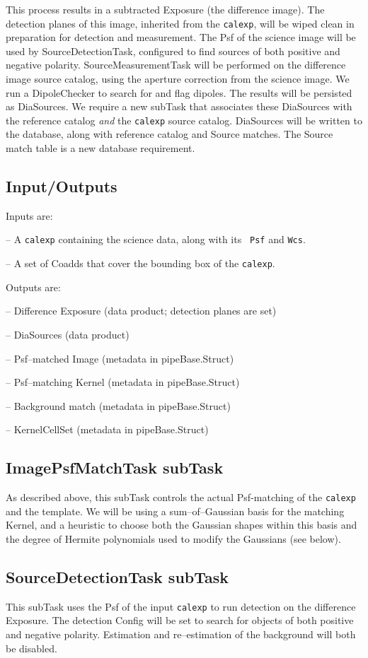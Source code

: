 \documentclass[prd, nofootinbib, floatfix, 11pt,tightenlines,times]{article}
\begin{document}
This process results in a subtracted Exposure (the difference image).
The detection planes of this image, inherited from the {\tt calexp},
will be wiped clean in preparation for detection and measurement.  The
Psf of the science image will be used by SourceDetectionTask,
configured to find sources of both positive and negative polarity.
SourceMeasurementTask will be performed on the difference image source
catalog, using the aperture correction from the science image.  We run
a DipoleChecker to search for and flag dipoles.  The results will be
persisted as DiaSources.  We require a new subTask that associates
these DiaSources with the reference catalog {\it and} the {\tt calexp}
source catalog.  DiaSources will be written to the database, along
with reference catalog and Source matches.  The Source match table is
a new database requirement.

\subsection{Input/Outputs}

Inputs are:

-- A {\tt calexp} containing the science data, along with its {\tt
  Psf} and {\tt Wcs}.

-- A set of Coadds that cover the bounding box of the {\tt calexp}.

Outputs are:

-- Difference Exposure (data product; detection planes are set)

-- DiaSources (data product)

-- Psf--matched Image (metadata in pipeBase.Struct)

-- Psf--matching Kernel (metadata in pipeBase.Struct)

-- Background match (metadata in pipeBase.Struct)

-- KernelCellSet (metadata in pipeBase.Struct)

\subsection{ImagePsfMatchTask subTask}
As described above, this subTask controls the actual Psf-matching of
the {\tt calexp} and the template.  We will be using a
sum--of--Gaussian basis for the matching Kernel, and a heuristic to
choose both the Gaussian shapes within this basis and the degree of
Hermite polynomials used to modify the Gaussians (see below).


\subsection{SourceDetectionTask subTask}
This subTask uses the Psf of the input {\tt calexp} to run detection
on the difference Exposure.  The detection Config will be set to
search for objects of both positive and negative polarity.  Estimation
and re--estimation of the background will both be disabled.
\end{document}
